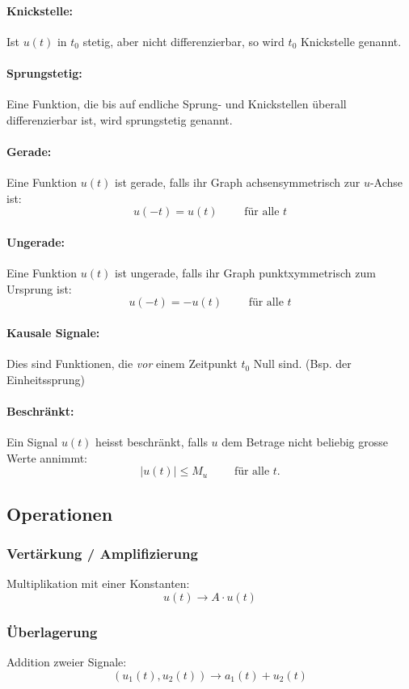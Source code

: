\paragraph{Knickstelle:}
Ist $u(t)$ in $t_0$ stetig, aber nicht differenzierbar, so wird $t_0$ Knickstelle genannt.
\paragraph{Sprungstetig:}
Eine Funktion, die bis auf endliche Sprung- und Knickstellen überall differenzierbar ist, wird sprungstetig genannt.
\paragraph{Gerade:} Eine Funktion $u(t)$ ist gerade, falls ihr Graph achsensymmetrisch zur $u$-Achse ist:
\[
	u(-t) = u(t) \qquad \text{ für alle } t
\]
\paragraph{Ungerade:} Eine Funktion $u(t)$ ist ungerade, falls ihr Graph punktxymmetrisch zum Ursprung ist:
\[
	u(-t) = -u(t) \qquad \text{ für alle } t
\]
\paragraph{Kausale Signale:} Dies sind Funktionen, die \textit{vor} einem Zeitpunkt $t_0$ Null sind. (Bsp. der Einheitssprung)
\paragraph{Beschränkt:} Ein Signal $u(t)$ heisst beschränkt, falls $u$ dem Betrage nicht beliebig grosse Werte annimmt:
\[
	\left| u(t) \right| \le M_u	\qquad \text{ für alle } t.
\]


\subsection{Operationen}
\subsubsection{Vertärkung / Amplifizierung}
Multiplikation mit einer Konstanten:
\[
	u(t) \rightarrow A \cdot u(t)
\]

\subsubsection{Überlagerung}
Addition zweier Signale:
\[
	(u_1(t),u_2(t)) \rightarrow a_1(t) + u_2(t)
\]

